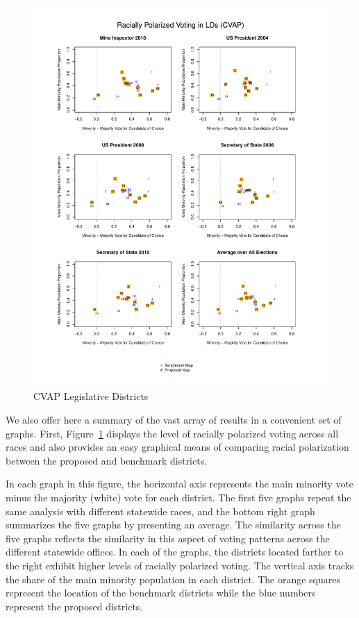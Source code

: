 \documentclass[12pt]{article}
\begin{document}
\begin{figure}[p!h]
\begin{center}
\includegraphics[scale=.8]{figs/cvap_ld_polarization.pdf}
\caption{\label{cvap_ld_polarization}CVAP Legislative Districts}
\end{center}
\end{figure}

We also offer here a summary of the vast array of results in a
convenient set of graphs.  First, Figure~\ref{cvap_ld_polarization}
displays the level of racially polarized voting across all races and
also provides an easy graphical means of comparing racial polarization
between the proposed and benchmark districts.

In each graph in this figure, the horizontal axis represents the main
minority vote minus the majority (white) vote for each
district.  The first five graphs repeat the same analysis with
different statewide races, and the bottom right graph summarizes the
five graphs by presenting an average.  The similarity across the five
graphs reflects the similarity in this aspect of voting patterns
across the different statewide offices.  In each of the graphs, the
districts located farther to the right exhibit higher levels of
racially polarized voting. The vertical axis tracks the share of the
main minority population in each district. The orange
squares represent the location of the benchmark districts while the
blue numbers represent the proposed districts.
\end{document}
